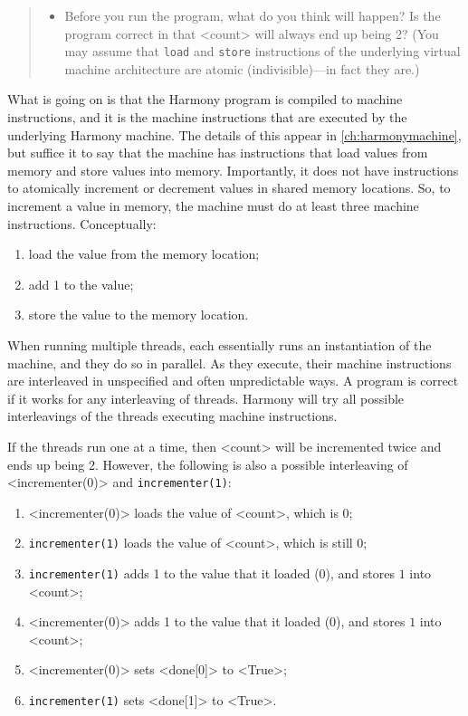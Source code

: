 \documentclass{report}
\begin{document}
\begin{quote}
\begin{itemize}
\item Before you run the program, what do you think will happen?  Is the
program correct in that <{count}> will always end up being 2?
(You may assume that \texttt{load} and \texttt{store} instructions of the
underlying virtual machine architecture are atomic (indivisible)---in fact
they are.)
\end{itemize}
\end{quote}

%

What is going on is that the Harmony program is compiled to machine instructions,
%
and it is the machine instructions that are executed by the underlying Harmony
machine.  The details of this appear in \autoref{ch:harmonymachine},
but suffice it to
say that the machine has instructions that load values from memory and store
values into memory.  Importantly, it does not have instructions to atomically
increment or decrement values in shared memory locations.
So, to increment a value in memory,
the machine must do at least three machine instructions.  Conceptually:
\begin{enumerate}
\item load the value from the memory location;
\item add 1 to the value;
\item store the value to the memory location.
\end{enumerate}

When running multiple threads, each essentially runs an instantiation of
the machine, and they do so in parallel.  As they execute, their machine
instructions are interleaved
%
in unspecified and often unpredictable ways.
A program is correct if it works for any interleaving of threads.
Harmony will try all possible interleavings of the threads
executing machine instructions.

If the threads run one at a time, then <{count}> will be incremented
twice and ends up being 2.  However, the following is also
a possible interleaving of <{incrementer(0)}> and \texttt{incrementer(1)}:
\begin{enumerate}
\item <{incrementer(0)}> loads the value of <{count}>, which is 0;
\item \texttt{incrementer(1)} loads the value of <{count}>, which is still 0;
\item \texttt{incrementer(1)} adds 1 to the value that it loaded (0), and
stores $1$ into <{count}>;
\item <{incrementer(0)}> adds 1 to the value that it loaded (0), and
stores $1$ into <{count}>;
\item <{incrementer(0)}> sets <{done[0]}> to <{True}>;
\item \texttt{incrementer(1)} sets <{done[1]}> to <{True}>.
\end{enumerate}
\end{document}
